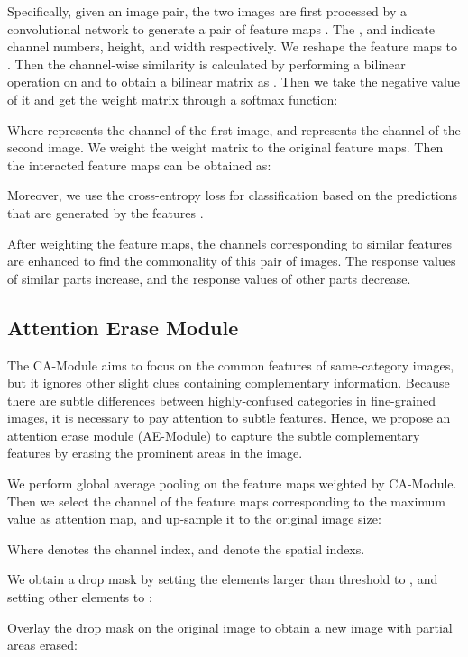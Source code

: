 \documentclass[conference]{IEEEtran}
\begin{document}
Specifically, given an image pair, the two images are first processed by a convolutional network to generate a pair of feature maps . The ,  and  indicate channel numbers, height, and width respectively. We reshape the feature maps   to  . Then the channel-wise similarity is calculated by performing a bilinear operation on   and   to obtain a bilinear matrix  as . Then we take the negative value of it and get the weight matrix through a softmax function:

Where  represents the  channel of the first image, and  represents the  channel of the second image. We weight the weight matrix  to the original feature maps. Then the interacted feature maps can be obtained as:


Moreover, we use the cross-entropy loss for classification based on the predictions that are generated by the features .

After weighting the feature maps, the channels corresponding to similar features are enhanced to find the commonality of this pair of images. The response values of similar parts increase, and the response values of other parts decrease.



\subsection{Attention Erase Module}

The CA-Module aims to focus on the common features of same-category images, but it ignores other slight clues containing complementary information. Because there are subtle differences between highly-confused categories in fine-grained images, it is necessary to pay attention to subtle features. Hence, we propose an attention erase module (AE-Module) to capture the subtle complementary features by erasing the prominent areas in the image.

We perform global average pooling on the feature maps weighted by CA-Module. Then we select the channel of the feature maps corresponding to the maximum value as attention map, and up-sample it to the original image size:

Where  denotes the channel index,  and  denote the spatial indexs.

We obtain a drop mask  by setting the elements  larger than threshold  to , and setting other elements to :


Overlay the drop mask on the original image to obtain a new image with partial areas erased:
\end{document}
